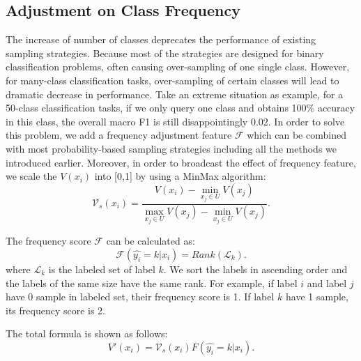 \subsection{Adjustment on Class Frequency}
\label{sec:classfreq}
The increase of number of classes deprecates the performance of
existing sampling strategies. Because most of the strategies are designed 
for binary classification problems, often causing over-sampling of 
one single class. However, for many-class classification tasks, 
over-sampling of certain classes will lead to dramatic decrease in performance. 
Take an extreme situation as example, for a 50-class classification tasks, 
if we only query one class and obtains 100\% accuracy in this class, 
the overall macro F1 is still disappointingly 0.02. 
In order to solve this problem, we add a frequency adjustment feature 
$\mathcal{F}$ which can be combined with most probability-based 
sampling strategies including all the methods we introduced earlier. 
Moreover, in order to broadcast the effect of frequency feature, 
we scale the $V(x_i)$ into [0,1] by using a MinMax algorithm: 
\begin{equation}
	\mathcal{V}_s(x_i) = \frac{V(x_i)-\min_{x_j\in U}V(x_j)}{\max_{x_j\in U}V(x_j) - \min_{x_j\in U}V(x_j)}. 
\end{equation}

The frequency score $\mathcal{F}$ can be calculated as:
\begin{equation}
    \mathcal{F}(\hat{y_i} = k|x_i) = Rank(\mathcal{L}_k).  
\end{equation}
where $\mathcal{L}_k$ is the labeled set of label $k$. We sort the labels in ascending order and the labels of the same size have the same rank. For example, if label $i$ and label $j$ have 0 sample in labeled set, their frequency score is 1. If label $k$ have 1 sample, its frequency score is 2.

The total formula is shown as follows:
\begin{equation}
    V'(x_i) = \mathcal{V}_s(x_i)F(\hat{y_i} = k|x_i).
\end{equation}

